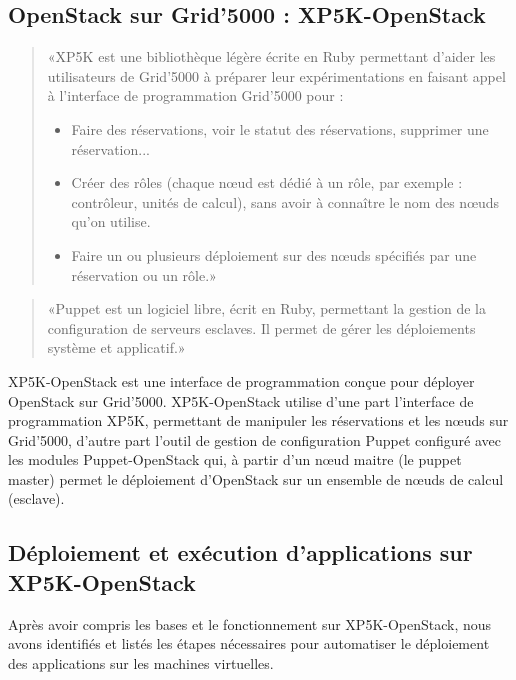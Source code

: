 \documentclass{report}
\begin{document}
		  \subsection{OpenStack sur Grid'5000 : XP5K-OpenStack}
		  
		     \begin{quote}  %
                «XP5K est une bibliothèque légère écrite en Ruby permettant d'aider les utilisateurs de Grid'5000 à préparer leur expérimentations en faisant appel à l'interface de programmation Grid'5000 pour :
                \begin{itemize}
                \item Faire des réservations, voir le statut des réservations, supprimer une réservation...
                \item Créer des rôles (chaque nœud est dédié à un rôle, par exemple : contrôleur, unités de calcul), sans avoir à connaître le nom des nœuds qu'on utilise.
                \item Faire un ou plusieurs déploiement sur des nœuds spécifiés par une réservation ou un rôle.» \cite{XP5K}
                \end{itemize}
            \end{quote}
            
            \begin{quote}
		       «Puppet est un logiciel libre, écrit en Ruby, permettant la gestion de la configuration de serveurs esclaves. Il permet de gérer les déploiements système et applicatif.»
		       \cite{Puppet}
		    \end{quote}
		   
            XP5K-OpenStack est une interface de programmation conçue pour déployer OpenStack sur Grid'5000.
            XP5K-OpenStack utilise d'une part l'interface de programmation XP5K, permettant de manipuler les réservations et les nœuds sur Grid'5000, d'autre part l'outil de gestion de configuration Puppet configuré avec les modules Puppet-OpenStack qui, à partir d'un nœud maitre (le puppet master) permet le déploiement d'OpenStack sur un ensemble de nœuds de calcul (esclave).
            
		  \subsection{Déploiement et exécution d'applications sur XP5K-OpenStack}
Après avoir compris les bases et le fonctionnement sur XP5K-OpenStack, nous avons identifiés et listés les étapes nécessaires pour automatiser le déploiement des applications sur les machines virtuelles.\bigbreak
\end{document}
